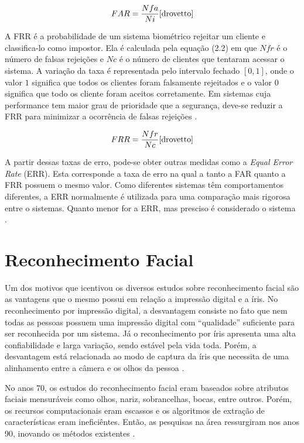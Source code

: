 	\begin{equation}
		FAR = \frac{Nfa}{Ni} \cite{drovetto}
	\end{equation} 

A FRR é a probabilidade de um sistema biométrico rejeitar um cliente e classifica-lo como impostor. Ela é calculada pela equação (2.2) em que $\displaystyle Nfr$ é o número de falsas rejeições e $\displaystyle Nc$ é o número de clientes que tentaram acessar o sistema. A variação da taxa é representada pelo intervalo fechado $\displaystyle [0,1]$, onde o valor $\displaystyle 1$ significa que todos os clientes foram falsamente rejeitados e o valor $\displaystyle 0$ significa que todo os cliente foram aceitos corretamente. Em sistemas cuja performance tem maior grau de prioridade que a segurança, deve-se reduzir a FRR para minimizar a ocorrência de falsas rejeições \cite{drovetto}.

	\begin{equation}
		FRR = \frac{Nfr}{Nc} \cite{drovetto}
	\end{equation} 

A partir dessas taxas de erro, pode-se obter outras medidas como a \textit{Equal Error Rate} (ERR). Esta corresponde a taxa de erro na qual a tanto a FAR quanto a FRR possuem o mesmo valor. Como diferentes sistemas têm comportamentos diferentes, a ERR normalmente é utilizada para uma comparação mais rigorosa entre o sistemas. Quanto menor for a ERR, mas presciso é considerado o sistema \cite{drovetto}.

\section{Reconhecimento Facial}

Um dos motivos que icentivou os diversos estudos sobre reconhecimento facial são as vantagens que o mesmo possui em relação a impressão digital e a íris.  No reconhecimento por impressão digital, a desvantagem consiste no fato que nem todas as pessoas possuem uma impressão digital com ``qualidade'' suficiente para ser reconhecida por um sistema. Já o reconhecimento por íris apresenta uma alta confiabilidade e larga variação, sendo estável pela vida toda. Porém, a desvantagem está relacionada ao modo de captura da íris que necessita de uma alinhamento entre a câmera e os olhos da pessoa \cite{saocarlos}.

No anos 70, os estudos do reconhecimento facial eram baseados sobre atributos faciais mensuráveis como olhos, nariz, sobrancelhas, bocas, entre outros. Porém, os recursos computacionais eram escassos e os algoritmos de extração de características eram ineficiêntes. Então, as pesquisas na área ressurgiram nos anos 90, inovando os métodos existentes \cite{hong, saocarlos}.







